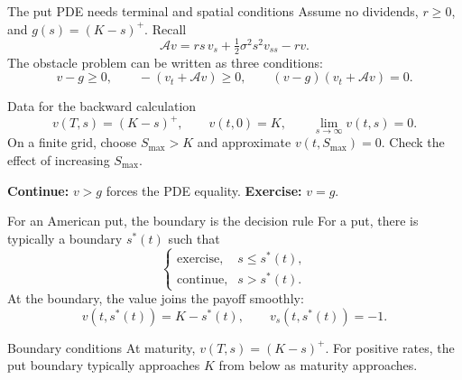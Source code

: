 \documentclass[handout,10pt,aspectratio=169]{beamer}
\begin{document}
\begin{frame}{The put PDE needs terminal and spatial conditions}
Assume no dividends, \(r\geq0\), and \(g(s)=(K-s)^+\). Recall
\[
\mathcal Av=rs\,v_s+\tfrac12\sigma^2s^2v_{ss}-rv.
\]
The obstacle problem can be written as three conditions:
\[
\boxed{v-g\geq0,\qquad -(v_t+\mathcal Av)\geq0,\qquad
       (v-g)(v_t+\mathcal Av)=0.}
\]
\begin{block}{Data for the backward calculation}
\[
v(T,s)=(K-s)^+,\qquad v(t,0)=K,\qquad
\lim_{s\to\infty}v(t,s)=0.
\]
On a finite grid, choose \(S_{\max}>K\) and approximate
\(v(t,S_{\max})=0\). Check the effect of increasing \(S_{\max}\).
\end{block}
\textbf{Continue:} \(v>g\) forces the PDE equality.
\quad\textbf{Exercise:} \(v=g\).
\end{frame}

\begin{frame}{For an American put, the boundary is the decision rule}
For a put, there is typically a boundary \(s^*(t)\) such that
\[
\begin{cases}
\text{exercise}, & s\leq s^*(t),\\
\text{continue}, & s>s^*(t).
\end{cases}
\]
At the boundary, the value joins the payoff smoothly:
\[
\boxed{v(t,s^*(t))=K-s^*(t),\qquad v_s(t,s^*(t))=-1.}
\]
\begin{block}{Boundary conditions}
At maturity, \(v(T,s)=(K-s)^+\). For positive rates, the put boundary
typically approaches \(K\) from below as maturity approaches.
\end{block}
\end{frame}
\end{document}
